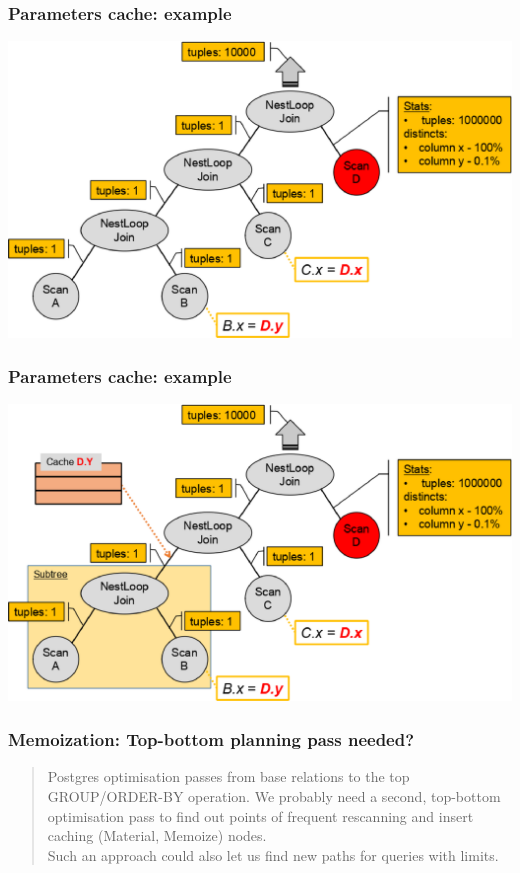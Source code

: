 \documentclass{beamer}
\begin{document}
\begin{frame}\frametitle{Parameters cache: example}
\hspace*{\fill}
	\includegraphics[scale=0.5]{pics/spool_example_1}
\hspace*{\fill}
\end{frame}

\begin{frame}\frametitle{Parameters cache: example}
\hspace*{\fill}
	\includegraphics[scale=0.5]{pics/spool_example_2}
\hspace*{\fill}
\end{frame}

\begin{frame}\frametitle{Memoization: Top-bottom planning pass needed?}
\begin{quote}
Postgres optimisation passes from base relations to the top GROUP/ORDER-BY operation. We probably need a second, top-bottom optimisation pass to find out points of frequent rescanning and insert caching (Material, Memoize) nodes. \\
Such an approach could also let us find new paths for queries with limits.
\end{quote}
\end{frame}
\end{document}
